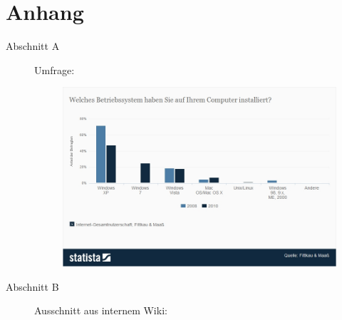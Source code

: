 

\chapter*{Anhang}


%
\begin{description}
\item[Abschnitt A]
Umfrage:
\begin{figure}[H]
\centering
\includegraphics[width=1\linewidth]{../images/Betriebssysteme.jpg}
\end{figure}

\item[Abschnitt B]
Ausschnitt aus internem Wiki: 
	 
	

\end{description}





